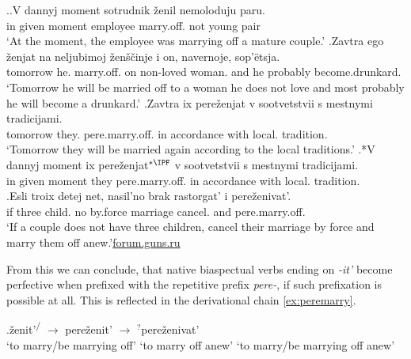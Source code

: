 \ex.\ag.\label{ex:peremarry1}V dannyj moment sotrudnik \v{z}enil\textsuperscript{\IPF} nemoloduju paru.\\
in given moment employee marry.off. {not young} pair\\
\trans `At the moment, the employee was marrying off a mature couple.'
\bg.\label{ex:peremarry2}Zavtra ego \v{z}enjat\textsuperscript{\PF} na neljubimoj \v{z}en\v{s}\v{c}inje i on, navernoje, sop'\"{e}tsja.\\
tomorrow he. marry.off. on non-loved woman. and he probably {become.drunkard.}\\
\trans `Tomorrow he will be married off to a woman he does not love and most probably he will become a drunkard.'
\bg.\label{ex:peremarry3}Zavtra ix pere\v{z}enjat\textsuperscript{\PF} v sootvetstvii s mestnymi tradicijami.\\
tomorrow they. pere.marry.off. in accordance with local. tradition.\\
\trans `Tomorrow they will be married again according to the local traditions.'
\bg.*V dannyj moment ix pere\v{z}enjat$^{*{\IPF}}$ v sootvetstvii s mestnymi tradicijami.\label{ex:peremarry4}\\
in given moment they pere.marry.off. in accordance with local. tradition.\\

\exg.\label{ex:perezenivat'}Esli troix detej net, nasil'no brak rastorgat' i pere\v{z}enivat'.\\
if three child. no by.force marriage cancel. and pere.marry.off.\\
\trans `If a couple does not have three children, cancel their marriage by force and marry them off anew.'\hbox{}\hfill\hbox{\url{forum.guns.ru}}

From this we can conclude, that native biaspectual verbs ending on \textit{-it'} become perfective when prefixed with the repetitive prefix \textit{pere-}, if such prefixation is possible at all. This is reflected in the derivational chain \ref{ex:peremarry}.

\exg.\label{ex:peremarry}\v{z}enit'\textsuperscript{\IPF\slash\PF} $\rightarrow$ pere\v{z}enit'\textsuperscript{\PF} $\rightarrow$ $^?$pere\v{z}enivat'\textsuperscript{\IPF} \\
{`to marry/be marrying off'} {} {`to marry off anew'} {} {`to marry/be marrying off anew'}\\

